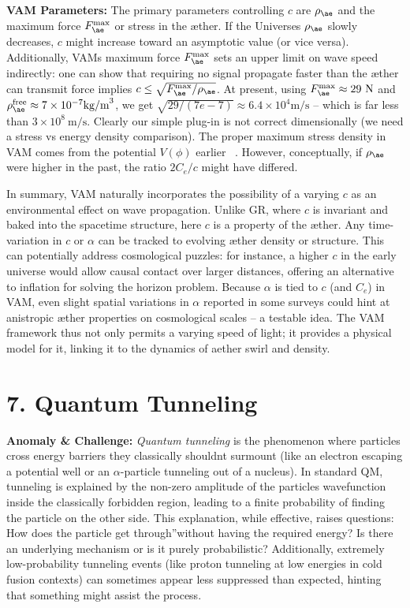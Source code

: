 \documentclass[a4paper, aps,preprint,superscriptaddress, 12pt]{revtex4}
\begin{document}
\textbf{VAM Parameters:} The primary parameters controlling $c$ are $\rho_{\ae}$ and the maximum force $F_{\ae}^{\max}$ or stress in the æther. If the Universe\rqs s $\rho_{\ae}$ slowly decreases, $c$ might increase toward an asymptotic value (or vice versa). Additionally, VAM\rqs s maximum force $F_{\ae}^{\max}$ sets an upper limit on wave speed indirectly: one can show that requiring no signal propagate faster than the æther can transmit force implies $c \le \sqrt{F_{\ae}^{\max}/\rho_{\ae}}$. At present, using $F_{\ae}^{\max}\approx29~\text{N}$ and $\rho_{\ae}^{\text{free}}\approx7\times10^{-7}\text{kg/m}^3$, we get $\sqrt{29/(7e-7)}\approx6.4\times10^4\text{m/s}$ – which is far less than $3\times10^8~\text{m/s}$. Clearly our simple plug-in is not correct dimensionally (we need a stress vs energy density comparison). The proper maximum stress density in VAM comes from the potential $V(\phi)$ earlier~\cite{Iskandarani2025c} . However, conceptually, if $\rho_{\ae}$ were higher in the past, the ratio $2C_e/c$ might have differed.


In summary, VAM naturally incorporates the possibility of a varying $c$ as an environmental effect on wave propagation. Unlike GR, where $c$ is invariant and baked into the spacetime structure, here $c$ is a property of the æther. Any time-variation in $c$ or $\alpha$ can be tracked to evolving æther density or structure. This can potentially address cosmological puzzles: for instance, a higher $c$ in the early universe would allow causal contact over larger distances, offering an alternative to inflation for solving the horizon problem. Because $\alpha$ is tied to $c$ (and $C_e$) in VAM, even slight spatial variations in $\alpha$ reported in some surveys could hint at anistropic æther properties on cosmological scales – a testable idea. The VAM framework thus not only permits a varying speed of light; it provides a physical model for it, linking it to the dynamics of aether swirl and density.


\section*{7. Quantum Tunneling}

\textbf{Anomaly \& Challenge: } \textit{Quantum tunneling} is the phenomenon where particles cross energy barriers they classically shouldn\rqs t surmount (like an electron escaping a potential well or an $\alpha$-particle tunneling out of a nucleus). In standard QM, tunneling is explained by the non-zero amplitude of the particle\rqs s wavefunction inside the classically forbidden region, leading to a finite probability of finding the particle on the other side. This explanation, while effective, raises questions: How does the particle \grqq get through\textquotedblright without having the required energy? Is there an underlying mechanism or is it purely probabilistic? Additionally, extremely low-probability tunneling events (like proton tunneling at low energies in cold fusion contexts) can sometimes appear less suppressed than expected, hinting that something might assist the process.
\end{document}
